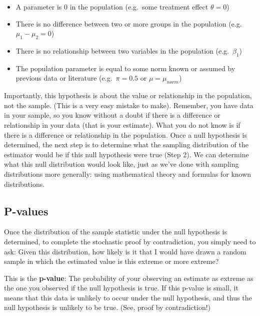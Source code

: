 \documentclass[
  letterpaper,
  DIV=11,
  numbers=noendperiod]{scrreprt}
\providecommand{\tightlist}{%
  \setlength{\itemsep}{0pt}\setlength{\parskip}{0pt}}\usepackage{longtable,booktabs,array}
\theoremstyle{definition}
\theoremstyle{remark}
\begin{document}
\begin{itemize}
\tightlist
\item
  A parameter is 0 in the population (e.g.~some treatment effect
  \(\theta = 0\))
\item
  There is no difference between two or more groups in the population
  (e.g.~\(\mu_1 - \mu_2 = 0\))
\item
  There is no relationship between two variables in the population
  (e.g.~\(\beta_1\))
\item
  The population parameter is equal to some norm known or assumed by
  previous data or literature (e.g.~\(\pi = 0.5\) or
  \(\mu = \mu_{norm}\))
\end{itemize}

Importantly, this hypothesis is about the value or relationship in the
population, not the sample. (This is a very easy mistake to make).
Remember, you have data in your sample, so you know without a doubt if
there is a difference or relationship in your data (that is your
estimate). What you do not know is if there is a difference or
relationship in the population. Once a null hypothesis is determined,
the next step is to determine what the sampling distribution of the
estimator would be if this null hypothesis were true (Step 2). We can
determine what this null distribution would look like, just as we've
done with sampling distributions more generally: using mathematical
theory and formulas for known distributions.

\hypertarget{p-values}{%
\subsection{P-values}\label{p-values}}

Once the distribution of the sample statistic under the null hypothesis
is determined, to complete the stochastic proof by contradiction, you
simply need to ask: Given this distribution, how likely is it that I
would have drawn a random sample in which the estimated value is this
extreme or more extreme?

This is the \textbf{p-value}: The probability of your observing an
estimate as extreme as the one you observed if the null hypothesis is
true. If this p-value is small, it means that this data is unlikely to
occur under the null hypothesis, and thus the null hypothesis is
unlikely to be true. (See, proof by contradiction!)
\end{document}
